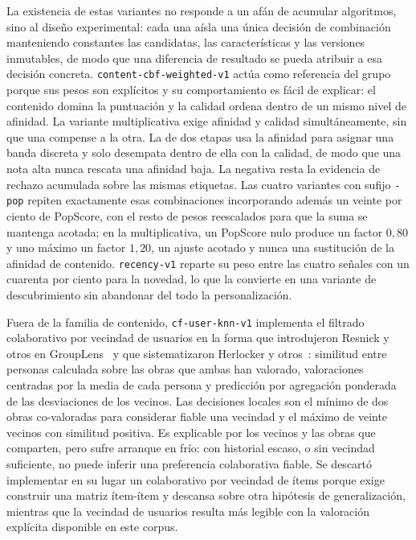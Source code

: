 La existencia de estas variantes no responde a un afán de acumular algoritmos, sino al
diseño experimental: cada una aísla una única decisión de combinación manteniendo constantes
las candidatas, las características y las versiones inmutables, de modo que una diferencia de resultado se pueda
atribuir a esa decisión concreta. \texttt{content-cbf-weighted-v1} actúa como referencia del
grupo porque sus pesos son explícitos y su comportamiento es fácil de explicar: el contenido
domina la puntuación y la calidad ordena dentro de un mismo nivel de afinidad. La variante
multiplicativa exige afinidad y calidad simultáneamente, sin que una compense a la otra. La de
dos etapas usa la afinidad para asignar una banda discreta y solo desempata dentro de ella con
la calidad, de modo que una nota alta nunca rescata una afinidad baja. La negativa resta la
evidencia de rechazo acumulada sobre las mismas etiquetas. Las cuatro variantes con sufijo
\texttt{-pop} repiten exactamente esas combinaciones incorporando además un veinte por ciento
de PopScore, con el resto de pesos reescalados para que la suma se mantenga acotada; en la
multiplicativa, un PopScore nulo produce un factor \(0{,}80\) y uno máximo un factor
\(1{,}20\), un ajuste acotado y nunca una sustitución de la afinidad de contenido.
\texttt{recency-v1} reparte su peso entre las cuatro señales con un cuarenta por ciento para la
novedad, lo que la convierte en una variante de descubrimiento sin abandonar del todo la
personalización.

Fuera de la familia de contenido, \texttt{cf-user-knn-v1} implementa el filtrado colaborativo
por vecindad de usuarios en la forma que introdujeron Resnick y otros en
GroupLens~\cite{resnick1994grouplens} y que sistematizaron Herlocker y
otros~\cite{herlocker2004evaluating}: similitud entre personas calculada sobre las obras que
ambas han valorado, valoraciones centradas por la media de cada persona y predicción por
agregación ponderada de las desviaciones de los vecinos. Las decisiones locales son el mínimo
de dos obras co-valoradas para considerar fiable una vecindad y el máximo de veinte vecinos con
similitud positiva. Es explicable por los vecinos y las obras que comparten, pero sufre
arranque en frío: con historial escaso, o sin vecindad suficiente, no puede inferir una
preferencia colaborativa fiable. Se descartó implementar en su lugar un colaborativo por
vecindad de ítems porque exige construir una matriz ítem-ítem y descansa sobre otra hipótesis
de generalización, mientras que la vecindad de usuarios resulta más legible con la valoración
explícita disponible en este corpus.

